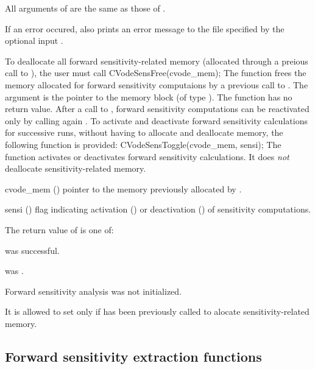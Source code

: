 {
  All arguments of  are the same as those of
  .

  If an error occured,  also prints an error message to the
  file specified by the optional input .
}
To deallocate all forward sensitivity-related memory (allocated through a preious call
to ), the user must call
{
  CVodeSensFree(cvode\_mem);
}
{
  The function  frees the memory allocated for forward sensitivity 
  computaions by a previous call to .
}
{
  The argument is the pointer to the {\cvodes} memory block (of type ).
}
{
  The function  has no return value.
}
{
  After a call to , forward sensitivity computations can be reactivated
  only by calling again .
}
To activate and deactivate forward sensitivity calculations for successive {\cvodes} runs,
without having to allocate and deallocate memory, the following function is provided:
{
  CVodeSensToggle(cvode\_mem, sensi);
}
{
  The function  activates or deactivates forward sensitivity 
  calculations. It does {\em not} deallocate sensitivity-related memory.
}
{
  \begin{args}
  \item[cvode\_mem] ()
    pointer to the memory previously allocated by .
  \item[sensi] ()
    flag indicating activation () or deactivation
    () of sensitivity computations.
  \end{args}
}
{
  The return value  of  is one of:
  \begin{args}
  \item[\Id{CV\_SUCCESS}] 
     was successful.
  \item[\Id{CV\_MEM\_NULL}] 
     was .
  \item[\Id{CV\_NO\_SENS}] 
    Forward sensitivity analysis was not initialized.
  \end{args}
}
{
  It is allowed to set  only if  has been
  previously called to alocate sensitivity-related memory.
}


\subsection{Forward sensitivity extraction functions}\label{ss:sensi_get}

